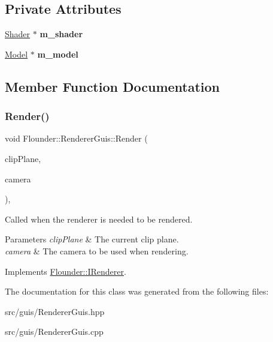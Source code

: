 \subsection*{Private Attributes}
\begin{DoxyCompactItemize}
\item 
\mbox{\label{class_flounder_1_1_renderer_guis_a1a147c15e6473ca48ddca36a958c2aa6}} 
\hyperlink{class_flounder_1_1_shader}{Shader} $\ast$ {\bfseries m\+\_\+shader}
\item 
\mbox{\label{class_flounder_1_1_renderer_guis_af8d1a6e5c5cdb14181fd38a8658421ec}} 
\hyperlink{class_flounder_1_1_model}{Model} $\ast$ {\bfseries m\+\_\+model}
\end{DoxyCompactItemize}


\subsection{Member Function Documentation}
\mbox{\label{class_flounder_1_1_renderer_guis_ad408b843ad27594ab940c11659b2e619}} 
\subsubsection{\texorpdfstring{Render()}{Render()}}
{\footnotesize\ttfamily void Flounder\+::\+Renderer\+Guis\+::\+Render (\begin{DoxyParamCaption}\item[{const \hyperlink{class_flounder_1_1_vector4}{Vector4} \&}]{clip\+Plane,  }\item[{const \hyperlink{class_flounder_1_1_i_camera}{I\+Camera} \&}]{camera }\end{DoxyParamCaption})\hspace{0.3cm}{\ttfamily [override]}, {\ttfamily [virtual]}}



Called when the renderer is needed to be rendered. 


\begin{DoxyParams}{Parameters}
{\em clip\+Plane} & The current clip plane. \\
\hline
{\em camera} & The camera to be used when rendering. \\
\hline
\end{DoxyParams}


Implements \hyperlink{class_flounder_1_1_i_renderer_a4e86d6621f6f63442e1c07655afd9daa}{Flounder\+::\+I\+Renderer}.



The documentation for this class was generated from the following files\+:\begin{DoxyCompactItemize}
\item 
src/guis/Renderer\+Guis.\+hpp\item 
src/guis/Renderer\+Guis.\+cpp\end{DoxyCompactItemize}
